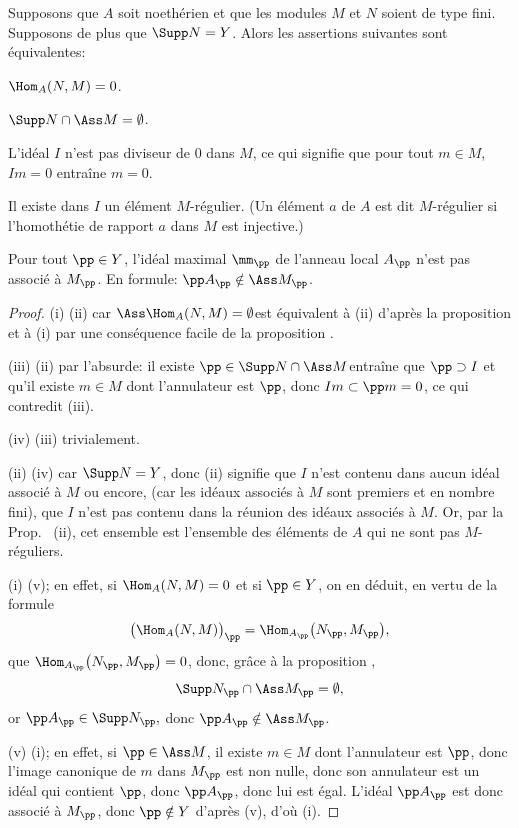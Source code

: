 \begin{lemme} \label{III.2.1}
Supposons que $A$ soit noeth\'erien et que les modules $M$ et $N$ soient de type fini. Supposons de plus que $\Supp N=Y$. Alors les assertions suivantes sont \'equivalentes:
\begin{enumeratei}
\item
$\Hom_A(N, M)=0$.
\item
$\Supp N \cap \Ass M = \emptyset$.
\item
L'id\'eal $I$ n'est pas diviseur de $0$ dans $M$, ce qui signifie que pour tout $m\in M$, $Im=0$ entra\^ine $m=0$.
\item
Il existe dans $I$ un \'el\'ement $M$-r\'egulier. (Un \'el\'ement $a$ de $A$ est dit $M$-r\'egulier si l'homoth\'etie de rapport $a$ dans $M$ est injective.)

\item
Pour tout $\pp \in Y$, l'id\'eal maximal $\mm_\pp$ de l'anneau local $A_\pp$ n'est pas associ\'e \`a $M_\pp$. En formule: $\pp A_\pp \notin \Ass M_\pp$.
\end{enumeratei}
\end{lemme}

\skpt
\begin{proof}
(i) \SSI (ii) car $\Ass \Hom_A(N, M)=\emptyset$\pageoriginale est \'equivalent \`a (ii) d'apr\`es la proposition  et \`a (i) par une cons\'equence facile de la proposition .

(iii) \ALORS (ii) par l'absurde: \og il existe $\pp \in \Supp N \cap \Ass M$\fg entra\^ine que $\pp \supset I$ et qu'il existe $m\in M$ dont l'annulateur est $\pp $, donc $Im \subset \pp m=0$, ce qui contredit (iii).

(iv) \ALORS (iii) trivialement.

(ii) \SSI (iv) car $\Supp N = Y$, donc (ii) signifie que $I$ n'est contenu dans aucun id\'eal associ\'e \`a $M$ ou encore, (car les id\'eaux associ\'es \`a $M$ sont premiers et en nombre fini), que $I$ n'est pas contenu dans la r\'eunion des id\'eaux associ\'es \`a $M$. Or, par la Prop. ~(ii), cet ensemble est l'ensemble des \'el\'ements de $A$ qui ne sont pas $M$-r\'eguliers.

(i) \ALORS (v); en effet, si $\Hom_A(N, M)=0$ et si $\pp \in Y$, on en d\'eduit, en vertu de la formule
\[
\bigl(\Hom_A(N, M) \bigr)_\pp = \Hom_{A_\pp} \bigl(N_\pp, M_\pp \bigr),
\]
que $\Hom_{A_\pp} \bigl(N_\pp, M_\pp \bigr)=0$, donc, gr\^ace \`a la proposition ,
\[
\Supp N_\pp \cap \Ass M_\pp = \emptyset,
\]
or $\pp A_\pp \in \Supp N_\pp, $ donc $ \pp A_\pp \notin \Ass M_\pp$.

(v) \ALORS (i); en effet, si $\pp \in \Ass M$, il existe $m\in M$ dont l'annulateur est $\pp$, donc l'image canonique de $m$ dans $M_\pp$ est non nulle, donc son annulateur est un id\'eal qui contient $\pp$, donc $\pp A_\pp$, donc lui est \'egal. L'id\'eal $\pp A_\pp$ est donc associ\'e \`a $M_\pp$, donc $\pp \notin Y$ d'apr\`es (v), d'o\`u (i).
\end{proof}

